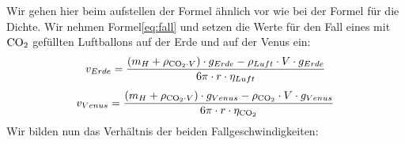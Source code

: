 \documentclass{article}
\begin{document}
        Wir gehen hier beim aufstellen der Formel ähnlich vor wie bei der Formel für die Dichte. Wir nehmen Formel\ref{eq:fall}
        und setzen die Werte für den Fall eines mit \(\ce{CO2}\) gefüllten Luftballons auf der Erde und auf der Venus ein:
        \begin{equation}
            v_{Erde} = \frac{ \left( m_H + \rho_{\ce{CO2} \cdot V } \right) \cdot g_{Erde} - \rho_{Luft} \cdot V \cdot g_{Erde} }{ 6\pi \cdot r \cdot \eta_{Luft} }
        \end{equation}
        \begin{equation}
            v_{Venus} = \frac{ \left( m_H + \rho_{\ce{CO2} \cdot V } \right) \cdot g_{Venus} - \rho_{\ce{CO2}} \cdot V \cdot g_{Venus} }{ 6\pi \cdot r \cdot \eta_{\ce{CO2}} }
        \end{equation}
        Wir bilden nun das Verhältnis der beiden Fallgeschwindigkeiten:
\end{document}
